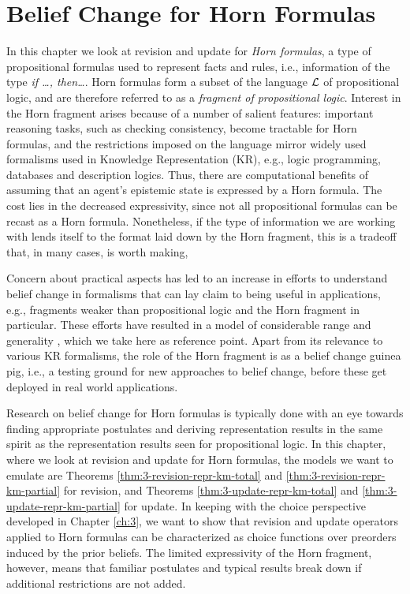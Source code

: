 \chapter{Belief Change for Horn Formulas}\label{ch:6}

In this chapter we look at revision and update for \emph{Horn formulas},
a type of propositional formulas used to represent facts and rules,
i.e., information of the type \emph{if \dots, then\dots}.
Horn formulas form a subset of the language $\mathcal{L}$ of propositional logic,
and are therefore referred to as a \emph{fragment of propositional logic}.
Interest in the Horn fragment arises because of a number of salient features:
important reasoning tasks, such as checking consistency,
become tractable for Horn formulas, and
the restrictions imposed on the language mirror widely used formalisms
used in Knowledge Representation (KR), 
e.g., logic programming, 
databases and description logics.
Thus, there are computational benefits 
of assuming that an agent's 
epistemic state is expressed by a Horn formula.
The cost lies in the decreased expressivity,
since not all propositional formulas 
can be recast as a Horn formula.
Nonetheless, if the type of information we are working with
lends itself to the format laid down by the Horn fragment,
this is a tradeoff that, in many cases, is worth making,

Concern about practical aspects has led to an increase in efforts 
to understand belief change in formalisms that can lay claim to being 
useful in applications, e.g., fragments weaker than propositional logic
and the Horn fragment in particular.
These efforts have resulted in a model of considerable range and generality
\cite{DelgrandeP15,DelgrandePW18}, which we take here as reference point.
Apart from its relevance to various KR formalisms,
the role of the Horn fragment is as a belief change guinea pig,
i.e., a testing ground for new approaches to belief change, 
before these get deployed in real world applications.

Research on belief change for Horn formulas 
is typically done
with an eye towards finding appropriate postulates
and deriving representation results
in the same spirit as the representation results
seen for propositional logic.
In this chapter, where we look at revision and update 
for Horn formulas,
the models we want to emulate 
are Theorems \ref{thm:3-revision-repr-km-total}
and \ref{thm:3-revision-repr-km-partial} for revision,
and Theorems \ref{thm:3-update-repr-km-total} and \ref{thm:3-update-repr-km-partial}
for update. 
In keeping with the choice perspective developed in Chapter \ref{ch:3},
we want to show that revision and update operators applied to Horn formulas
can be characterized as choice functions over preorders 
induced by the prior beliefs.
The limited expressivity of the Horn fragment,
however, means that familiar postulates and
typical results break down if 
additional restrictions 
are not added.

